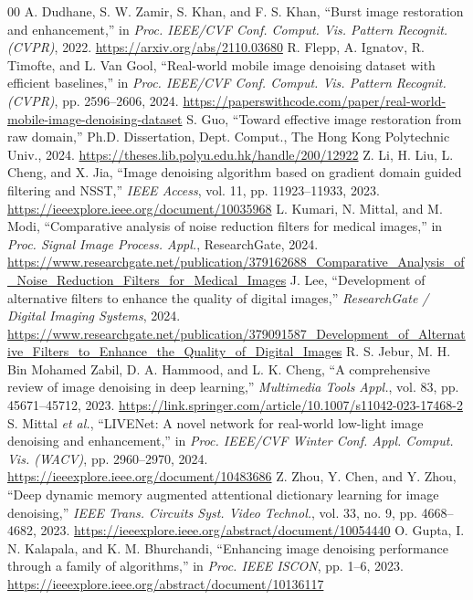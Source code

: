 \documentclass{ieeeaccess}
\begin{document}
\begin{thebibliography}{00}
 A. Dudhane, S. W. Zamir, S. Khan, and F. S. Khan, ``Burst image restoration and enhancement,'' in \textit{Proc. IEEE/CVF Conf. Comput. Vis. Pattern Recognit. (CVPR)}, 2022. \url{https://arxiv.org/abs/2110.03680}
 R. Flepp, A. Ignatov, R. Timofte, and L. Van Gool, ``Real-world mobile image denoising dataset with efficient baselines,'' in \textit{Proc. IEEE/CVF Conf. Comput. Vis. Pattern Recognit. (CVPR)}, pp. 2596--2606, 2024. \url{https://paperswithcode.com/paper/real-world-mobile-image-denoising-dataset}
 S. Guo, ``Toward effective image restoration from raw domain,'' Ph.D. Dissertation, Dept. Comput., The Hong Kong Polytechnic Univ., 2024. \url{https://theses.lib.polyu.edu.hk/handle/200/12922}
 Z. Li, H. Liu, L. Cheng, and X. Jia, ``Image denoising algorithm based on gradient domain guided filtering and NSST,'' \textit{IEEE Access}, vol. 11, pp. 11923--11933, 2023. \url{https://ieeexplore.ieee.org/document/10035968}
 L. Kumari, N. Mittal, and M. Modi, ``Comparative analysis of noise reduction filters for medical images,'' in \textit{Proc. Signal Image Process. Appl.}, ResearchGate, 2024. \url{https://www.researchgate.net/publication/379162688_Comparative_Analysis_of_Noise_Reduction_Filters_for_Medical_Images}
 J. Lee, ``Development of alternative filters to enhance the quality of digital images,'' \textit{ResearchGate / Digital Imaging Systems}, 2024. \url{https://www.researchgate.net/publication/379091587_Development_of_Alternative_Filters_to_Enhance_the_Quality_of_Digital_Images}
 R. S. Jebur, M. H. Bin Mohamed Zabil, D. A. Hammood, and L. K. Cheng, ``A comprehensive review of image denoising in deep learning,'' \textit{Multimedia Tools Appl.}, vol. 83, pp. 45671--45712, 2023. \url{https://link.springer.com/article/10.1007/s11042-023-17468-2}
 S. Mittal \textit{et al.}, ``LIVENet: A novel network for real-world low-light image denoising and enhancement,'' in \textit{Proc. IEEE/CVF Winter Conf. Appl. Comput. Vis. (WACV)}, pp. 2960--2970, 2024. \url{https://ieeexplore.ieee.org/document/10483686}
 Z. Zhou, Y. Chen, and Y. Zhou, ``Deep dynamic memory augmented attentional dictionary learning for image denoising,'' \textit{IEEE Trans. Circuits Syst. Video Technol.}, vol. 33, no. 9, pp. 4668--4682, 2023. \url{https://ieeexplore.ieee.org/abstract/document/10054440}
 O. Gupta, I. N. Kalapala, and K. M. Bhurchandi, ``Enhancing image denoising performance through a family of algorithms,'' in \textit{Proc. IEEE ISCON}, pp. 1--6, 2023. \url{https://ieeexplore.ieee.org/abstract/document/10136117}

\end{thebibliography}
\end{document}
